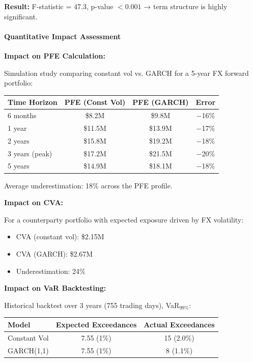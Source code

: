 \textbf{Result:} F-statistic = 47.3, p-value $< 0.001$ → term structure is highly significant.

\paragraph{Quantitative Impact Assessment}

\textbf{Impact on PFE Calculation:}

Simulation study comparing constant vol vs. GARCH for a 5-year FX forward portfolio:

\begin{center}
	\begin{tabular}{|l|c|c|c|}
		\hline
		\textbf{Time Horizon} & \textbf{PFE (Const Vol)} & \textbf{PFE (GARCH)} & \textbf{Error} \\
		\hline
		6 months & \$8.2M & \$9.8M & $-$16\% \\
		1 year & \$11.5M & \$13.9M & $-$17\% \\
		2 years & \$15.8M & \$19.2M & $-$18\% \\
		3 years (peak) & \$17.2M & \$21.5M & $-$20\% \\
		5 years & \$14.9M & \$18.1M & $-$18\% \\
		\hline
	\end{tabular}
\end{center}

Average underestimation: 18\% across the PFE profile.

\textbf{Impact on CVA:}

For a counterparty portfolio with expected exposure driven by FX volatility:

\begin{itemize}
	\item CVA (constant vol): \$2.15M
	\item CVA (GARCH): \$2.67M
	\item Underestimation: 24\%
\end{itemize}

\textbf{Impact on VaR Backtesting:}

Historical backtest over 3 years (755 trading days), VaR$_{99\%}$:

\begin{center}
	\begin{tabular}{|l|c|c|}
		\hline
		\textbf{Model} & \textbf{Expected Exceedances} & \textbf{Actual Exceedances} \\
		\hline
		Constant Vol & 7.55 (1\%) & 15 (2.0\%) \\
		GARCH(1,1) & 7.55 (1\%) & 8 (1.1\%) \\
		\hline
	\end{tabular}
\end{center}


